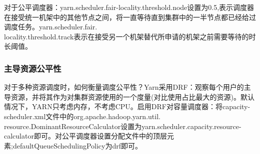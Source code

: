 \documentclass[a4paper]{article}
\begin{document}
	对于公平调度器：yarn.scheduler.fair-locality.threshold.node设置为0.5,表示调度器在接受统一机架中的其他节点之间，将一直等待直到集群中的一半节点都已经给过调度任务。yarn.scheduler.fair.\\locality.threshold.track表示在接受另一个机架替代所申请的机架之前需要等待的时长阈值。
	
	\subsubsection{主导资源公平性}
	对于多种资源调度时，如何衡量调度公平性？Yarn采用DRF：观察每个用户的主导资源，并将其作为对集群资源使用的一个度量(对比使用占比最大的资源)。默认情况下，YARN只考虑内存，不考虑CPU。启用DRF对容量调度器：将capacity-scheduler.xml文件中的org.apache.hadoop.yarn.util.\\resource.DominantResourceCalculator设置为yarn.scheduler.capacity.resource-calculator即可。对公平调度器设置分配文件中的顶层元素;defaultQueueSchedulingPolicy为drf即可。
\end{document}
